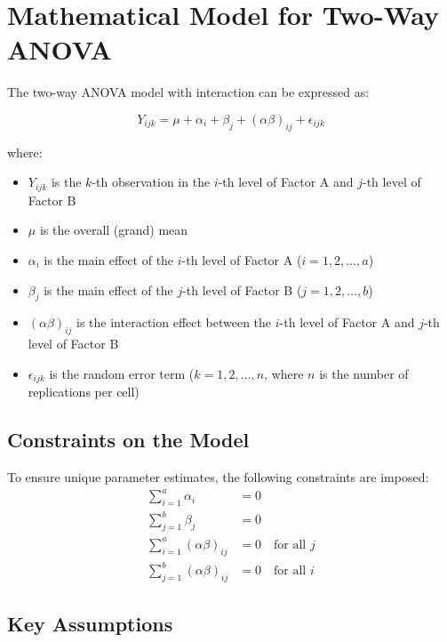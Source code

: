 \documentclass[twoside]{book}
\begin{document}
\section{Mathematical Model for Two-Way ANOVA}

The two-way ANOVA model with interaction can be expressed as:

\begin{textbox}
\begin{equation*}
Y_{ijk} = \mu + \alpha_i + \beta_j + (\alpha\beta)_{ij} + \epsilon_{ijk}
\end{equation*}
\end{textbox}

where:
\begin{itemize}
\item $Y_{ijk}$ is the $k$-th observation in the $i$-th level of Factor A and $j$-th level of Factor B
\item $\mu$ is the overall (grand) mean
\item $\alpha_i$ is the main effect of the $i$-th level of Factor A ($i = 1, 2, \ldots, a$)
\item $\beta_j$ is the main effect of the $j$-th level of Factor B ($j = 1, 2, \ldots, b$)
\item $(\alpha\beta)_{ij}$ is the interaction effect between the $i$-th level of Factor A and $j$-th level of Factor B
\item $\epsilon_{ijk}$ is the random error term ($k = 1, 2, \ldots, n$, where $n$ is the number of replications per cell)
\end{itemize}

\subsection{Constraints on the Model}

To ensure unique parameter estimates, the following constraints are imposed:
\begin{align*}
\sum_{i=1}^a \alpha_i &= 0 \\
\sum_{j=1}^b \beta_j &= 0 \\
\sum_{i=1}^a (\alpha\beta)_{ij} &= 0 \quad \text{for all } j \\
\sum_{j=1}^b (\alpha\beta)_{ij} &= 0 \quad \text{for all } i
\end{align*}

\subsection{Key Assumptions}
\end{document}
